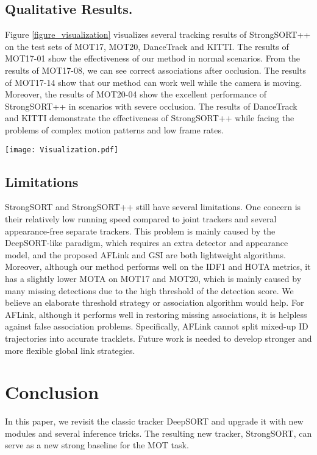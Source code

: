 \documentclass[lettersize,journal]{IEEEtran}
\begin{document}
\subsection{Qualitative Results.}

Figure \ref{figure_visualization} visualizes several tracking results of StrongSORT++ 
on the test sets of MOT17, MOT20, DanceTrack and KITTI.
The results of MOT17-01 show the effectiveness of our method in normal scenarios.
From the results of MOT17-08, we can see correct associations after occlusion.
The results of MOT17-14 show that our method can work well while the camera is moving.
Moreover, the results of MOT20-04 show the excellent performance of StrongSORT++ in scenarios with severe occlusion.
The results of DanceTrack and KITTI demonstrate the effectiveness of StrongSORT++ 
while facing the problems of complex motion patterns and low frame rates.

\begin{figure*}[!h]
  \centering
  \texttt{[image: Visualization.pdf]}
  \caption{
    Sample tracking results visualization of StrongSORT++ on the test sets of MOT17, MOT20, DanceTrack and KITTI.
    The box color corresponds to the ID.
  }
  \label{figure_visualization}
\end{figure*}

\subsection{Limitations}

StrongSORT and StrongSORT++ still have several limitations.
One concern is their relatively low running speed compared to joint trackers and several appearance-free separate trackers.
This problem is mainly caused by the DeepSORT-like paradigm, which requires an extra detector and appearance model,
and the proposed AFLink and GSI are both lightweight algorithms.
Moreover, although our method performs well on the IDF1 and HOTA metrics, it has a slightly lower MOTA on MOT17 and MOT20,
which is mainly caused by many missing detections due to the high threshold of the detection score.
We believe an elaborate threshold strategy or association algorithm would help.
For AFLink, although it performs well in restoring missing associations, it is helpless against false association problems.
Specifically, AFLink cannot split mixed-up ID trajectories into accurate tracklets.
Future work is needed to develop stronger and more flexible global link strategies.

\section{Conclusion}
In this paper, we revisit the classic tracker DeepSORT and upgrade it with new modules and several inference tricks.
The resulting new tracker, StrongSORT, can serve as a new strong baseline for the MOT task.
\end{document}
